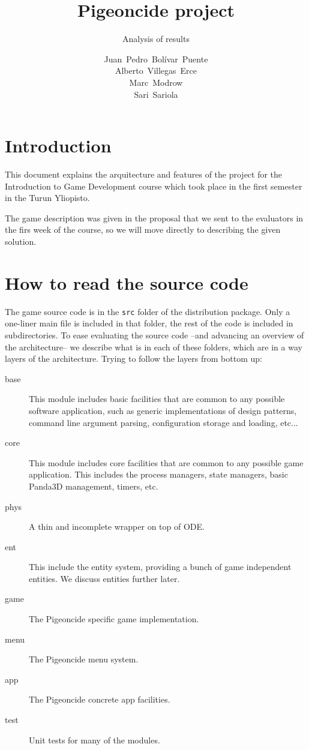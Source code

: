 \documentclass[a4paper,10pt]{article}
\title{Pigeoncide project}
\subtitle{Analysis of results}
\author{Juan~Pedro~Bolívar~Puente\\Alberto~Villegas~Erce\\Marc~Modrow\\Sari~Sariola}
\begin{document}
\raskolnikovmaketitle
\tableofcontents


\section{Introduction}

This document explains the arquitecture and features of the project
for the Introduction to Game Development course which took place in
the first semester in the Turun Yliopisto.

The game description was given in the proposal that we sent to the
evaluators in the firs week of the course, so we will move directly to
describing the given solution.

\section{How to read the source code}

The game source code is in the \texttt{src} folder of the distribution
package. Only a one-liner main file is included in that folder, the
rest of the code is included in subdirectories. To ease evaluating the
source code --and advancing an overview of the architecture-- we
describe what is in each of these folders, which are in a way layers
of the architecture. Trying to follow the layers from bottom up:

\begin{description}
\item[base] This module includes basic facilities that are common to
  any possible software application, such as generic implementations
  of design patterns, command line argument parsing, configuration
  storage and loading, etc...

\item[core] This module includes core facilities that are common to
  any possible game application. This includes the process managers,
  state managers, basic Panda3D management, timers, etc.

\item[phys] A thin and incomplete wrapper on top of ODE.

\item[ent] This include the entity system, providing a bunch of game
  independent entities. We discuss entities further later.

\item[game] The Pigeoncide specific game implementation.

\item[menu] The Pigeoncide menu system.

\item[app] The Pigeoncide concrete app facilities.

\item[test] Unit tests for many of the modules.

\end{description}
\end{document}
